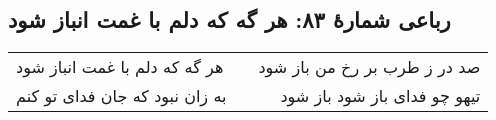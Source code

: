 \begin{center}
\section*{رباعی شمارهٔ ۸۳: هر گه که دلم با غمت انباز شود }
\label{sec:083}
\begin{longtable}{l p{0.5cm} r}
هر گه که دلم با غمت انباز شود 
&&
صد در ز طرب بر رخ من باز شود
\\
به زان نبود که جان فدای تو کنم 
&&
تیهو چو فدای باز شود باز شود
\\
\end{longtable}
\end{center}
